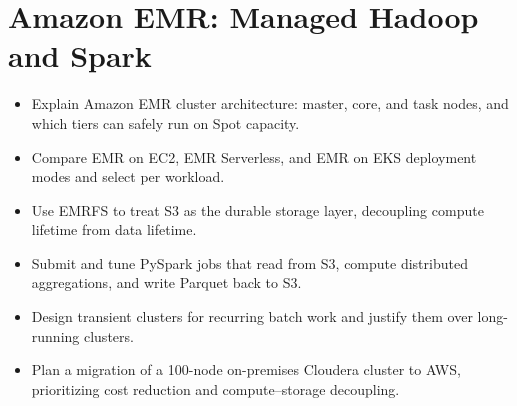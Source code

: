 \chapter{Amazon EMR: Managed Hadoop and Spark}
%
\begin{objectives}
\begin{itemize}
    \item Explain Amazon EMR cluster architecture: master, core, and task nodes, and which tiers can safely run on Spot capacity.
    \item Compare EMR on EC2, EMR Serverless, and EMR on EKS deployment modes and select per workload.
    \item Use EMRFS to treat S3 as the durable storage layer, decoupling compute lifetime from data lifetime.
    \item Submit and tune PySpark jobs that read from S3, compute distributed aggregations, and write Parquet back to S3.
    \item Design transient clusters for recurring batch work and justify them over long-running clusters.
    \item Plan a migration of a 100-node on-premises Cloudera cluster to AWS, prioritizing cost reduction and compute--storage decoupling.
\end{itemize}
\end{objectives}

